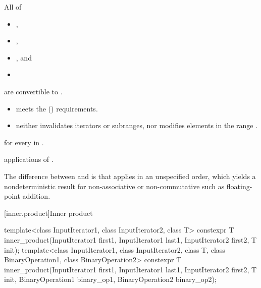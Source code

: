 \begin{itemdescr}

\pnum
\mandates
All of
\begin{itemize}
\item {},
\item {},
\item {}, and
\item {}
\end{itemize}
are convertible to .

\pnum
\expects
\begin{itemize}
\item
   meets the  () requirements.
\item
   neither invalidates iterators or subranges,
  nor modifies elements in the range .
\end{itemize}

\pnum
\returns
{}
for every  in .

\pnum
\complexity
{} applications of .

\pnum
\begin{note}
The difference between  and  is that
 applies  in an unspecified order,
which yields a nondeterministic result
for non-associative or non-commutative 
such as floating-point addition.
\end{note}
\end{itemdescr}

[inner.product]{Inner product}

%
\begin{itemdecl}
template<class InputIterator1, class InputIterator2, class T>
  constexpr T inner_product(InputIterator1 first1, InputIterator1 last1,
                            InputIterator2 first2, T init);
template<class InputIterator1, class InputIterator2, class T,
         class BinaryOperation1, class BinaryOperation2>
  constexpr T inner_product(InputIterator1 first1, InputIterator1 last1,
                            InputIterator2 first2, T init,
                            BinaryOperation1 binary_op1,
                            BinaryOperation2 binary_op2);
\end{itemdecl}


